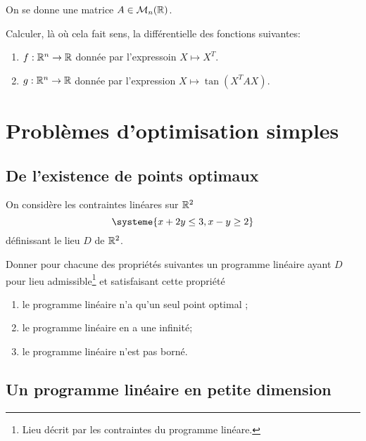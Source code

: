 \documentclass[11pt, a4paper]{article}
\begin{document}
\noindent On se donne une matrice $A \in \mathcal{M}_n(\mathbb{R})$.
\begin{question}{2}
  Calculer, là où cela fait sens, la différentielle des fonctions
  suivantes:
  \begin{enumerate}
  \item $f :\mathbb{R}^n \rightarrow \mathbb{R}$ donnée par l'expressoin
    $X \mapsto X^T$.
  \item $g : \mathbb{R}^n \rightarrow \mathbb{R}$ donnée par l'expression
    $X \mapsto \tan(X^TAX)$.
  \end{enumerate}
\end{question}

\section{Problèmes d'optimisation simples}

\subsection{De l'existence de points optimaux}

\noindent On considère les contraintes linéares sur $\mathbb{R}^2$
\[
\systeme{
  x + 2y \leq 3,
  x - y  \geq 2
}
\]
définissant le lieu $D$ de $\mathbb{R}^2$.
\begin{question}{2}
  Donner pour chacune des propriétés suivantes un programme linéaire
  ayant $D$ pour lieu admissible\footnote{Lieu décrit par les
    contraintes du programme linéare.} et satisfaisant cette propriété
  \begin{enumerate}
  \item le programme linéaire n'a qu'un seul point optimal ;
  \item le programme linéaire en a une infinité;
  \item le programme linéaire n'est pas borné.
  \end{enumerate}
\end{question}

\subsection{Un programme linéaire en petite dimension}
\end{document}
